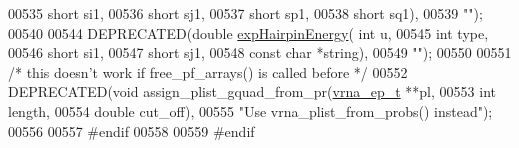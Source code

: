 \begin{DoxyCode}
00535                                 \textcolor{keywordtype}{short} si1,
00536                                 \textcolor{keywordtype}{short} sj1,
00537                                 \textcolor{keywordtype}{short} sp1,
00538                                 \textcolor{keywordtype}{short} sq1),
00539 \textcolor{stringliteral}{""});
00540 
00544 DEPRECATED(\textcolor{keywordtype}{double} \hyperlink{part__func_8h_a7b6ab474cc80accc48010ccfcc59f96b}{expHairpinEnergy}( \textcolor{keywordtype}{int} u,
00545                                     \textcolor{keywordtype}{int} type,
00546                                     \textcolor{keywordtype}{short} si1,
00547                                     \textcolor{keywordtype}{short} sj1,
00548                                     \textcolor{keyword}{const} \textcolor{keywordtype}{char} *\textcolor{keywordtype}{string}),
00549 \textcolor{stringliteral}{""});
00550 
00551 \textcolor{comment}{/* this doesn't work if free\_pf\_arrays() is called before */}
00552 DEPRECATED(\textcolor{keywordtype}{void} assign\_plist\_gquad\_from\_pr(\hyperlink{group__struct__utils_structvrna__elem__prob__s}{vrna\_ep\_t} **pl,
00553                                 \textcolor{keywordtype}{int} length,
00554                                 \textcolor{keywordtype}{double} cut\_off),
00555 \textcolor{stringliteral}{"Use vrna\_plist\_from\_probs() instead"});
00556 
00557 \textcolor{preprocessor}{#endif}
00558 
00559 \textcolor{preprocessor}{#endif}
\end{DoxyCode}
